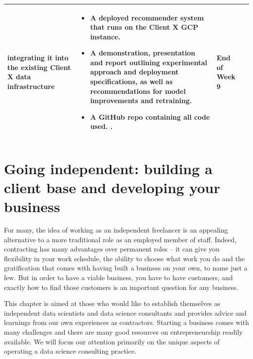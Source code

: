 \documentclass[
]{book}
\providecommand{\tightlist}{%
  \setlength{\itemsep}{0pt}\setlength{\parskip}{0pt}}
\begin{document}
\begin{smaller}
\begin{longtable}[]{@{}llll@{}}
\begin{minipage}[t]{0.30\columnwidth}
\begin{itemize}
  integrating it into the existing Client X data infrastructure
\end{itemize}\strut
\end{minipage} & \begin{minipage}[t]{0.30\columnwidth}\raggedright
\begin{itemize}
\tightlist
\item
  A deployed recommender system that runs on the Client X GCP instance.
\item
  A demonstration, presentation and report outlining experimental
  approach and deployment specifications, as well as recommendations for
  model improvements and retraining.
\item
  A GitHub repo containing all code used. .
\end{itemize}\strut
\end{minipage} & \begin{minipage}[t]{0.15\columnwidth}\raggedright
End of Week 9\strut
\end{minipage}\tabularnewline
\bottomrule
\end{longtable}

\end{smaller}

\hypertarget{consulting}{%
\chapter{Going independent: building a client base and developing your
business}\label{consulting}}

For many, the idea of working as an independent freelancer is an
appealing alternative to a more traditional role as an employed member
of staff. Indeed, contracting has many advantages over permanent roles
-- it can give you flexibility in your work schedule, the ability to
choose what work you do and the gratification that comes with having
built a business on your own, to name just a few. But in order to have a
viable business, you have to have customers, and exactly how to find
those customers is an important question for any business.

This chapter is aimed at those who would like to establish themselves as
independent data scientists and data science consultants and provides
advice and learnings from our own experiences as contractors. Starting a
business comes with many challenges and there are many good resources on
entrepreneurship readily available. We will focus our attention
primarily on the unique aspects of operating a data science consulting
practice.
\end{document}
